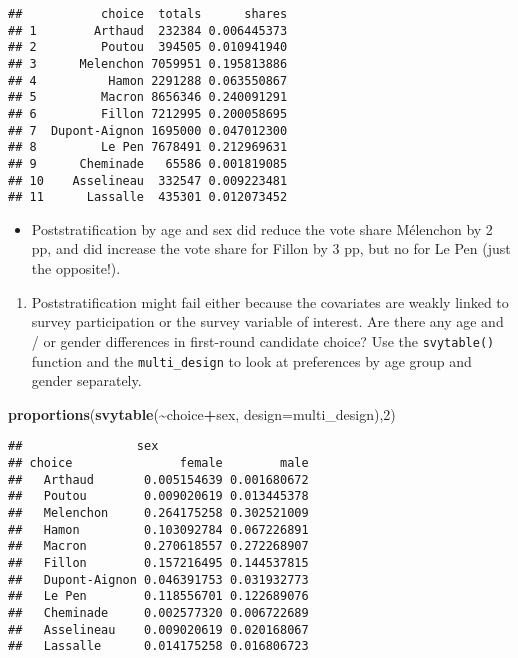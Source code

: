 \documentclass[
]{article}
\newenvironment{Shaded}{\begin{snugshade}}{\end{snugshade}}
\newcommand{\AttributeTok}[1]{\textcolor[rgb]{0.13,0.29,0.53}{#1}}
\newcommand{\DecValTok}[1]{\textcolor[rgb]{0.00,0.00,0.81}{#1}}
\newcommand{\FunctionTok}[1]{\textcolor[rgb]{0.13,0.29,0.53}{\textbf{#1}}}
\newcommand{\NormalTok}[1]{#1}
\newcommand{\SpecialCharTok}[1]{\textcolor[rgb]{0.81,0.36,0.00}{\textbf{#1}}}
\providecommand{\tightlist}{%
  \setlength{\itemsep}{0pt}\setlength{\parskip}{0pt}}
\begin{document}
\begin{verbatim}
##           choice  totals      shares
## 1        Arthaud  232384 0.006445373
## 2         Poutou  394505 0.010941940
## 3      Melenchon 7059951 0.195813886
## 4          Hamon 2291288 0.063550867
## 5         Macron 8656346 0.240091291
## 6         Fillon 7212995 0.200058695
## 7  Dupont-Aignon 1695000 0.047012300
## 8         Le Pen 7678491 0.212969631
## 9      Cheminade   65586 0.001819085
## 10    Asselineau  332547 0.009223481
## 11      Lassalle  435301 0.012073452
\end{verbatim}

\begin{itemize}
\tightlist
\item
  Poststratification by age and sex did reduce the vote share Mélenchon
  by 2 pp, and did increase the vote share for Fillon by 3 pp, but no
  for Le Pen (just the opposite!).
\end{itemize}

\begin{enumerate}
\def\labelenumi{\arabic{enumi}.}
\setcounter{enumi}{5}
\tightlist
\item
  Poststratification might fail either because the covariates are weakly
  linked to survey participation or the survey variable of interest. Are
  there any age and / or gender differences in first-round candidate
  choice? Use the \texttt{svytable()} function and the
  \texttt{multi\_design} to look at preferences by age group and gender
  separately.
\end{enumerate}

\begin{Shaded}
\begin{Highlighting}[]
\FunctionTok{proportions}\NormalTok{(}\FunctionTok{svytable}\NormalTok{(}\SpecialCharTok{\textasciitilde{}}\NormalTok{choice}\SpecialCharTok{+}\NormalTok{sex, }\AttributeTok{design=}\NormalTok{multi\_design),}\DecValTok{2}\NormalTok{)}
\end{Highlighting}
\end{Shaded}

\begin{verbatim}
##                sex
## choice               female        male
##   Arthaud       0.005154639 0.001680672
##   Poutou        0.009020619 0.013445378
##   Melenchon     0.264175258 0.302521009
##   Hamon         0.103092784 0.067226891
##   Macron        0.270618557 0.272268907
##   Fillon        0.157216495 0.144537815
##   Dupont-Aignon 0.046391753 0.031932773
##   Le Pen        0.118556701 0.122689076
##   Cheminade     0.002577320 0.006722689
##   Asselineau    0.009020619 0.020168067
##   Lassalle      0.014175258 0.016806723
\end{verbatim}
\end{document}
